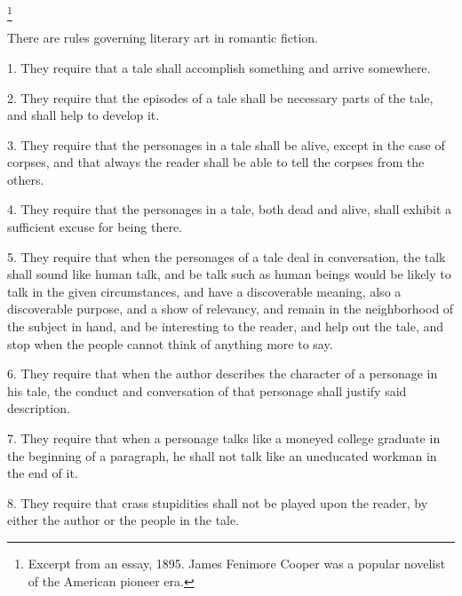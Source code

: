 \documentclass[../interior-demo.tex]{subfiles}
\begin{document}
\begin{upperpage}
\footnote{Excerpt from an essay, 1895. James Fenimore Cooper was a popular
novelist of the American pioneer era.}
\end{upperpage}
There are rules governing literary art in romantic fiction.

1. They require that a tale shall accomplish something and arrive
somewhere.

2. They require that the episodes of a tale shall be necessary parts of
the tale, and shall help to develop it.

3. They require that the personages in a tale shall be alive, except in
the case of corpses, and that always the reader shall be able to tell
the corpses from the others.

4. They require that the personages in a tale, both dead and alive,
shall exhibit a sufficient excuse for being there.

5. They require that when the personages of a tale deal in conversation,
the talk shall sound like human talk, and be talk such as human
beings would be likely to talk in the given circumstances, and have
a discoverable meaning, also a discoverable purpose, and a show of
relevancy, and remain in the neighborhood of the subject in hand, and
be interesting to the reader, and help out the tale, and stop when the
people cannot think of anything more to say.

6. They require that when the author describes the character of a
personage in his tale, the conduct and conversation of that personage
shall justify said description.

7. They require that when a personage talks like a moneyed college
graduate in the beginning of a paragraph, he shall not talk like an uneducated
workman in the end of it.

8. They require that crass stupidities shall not be played upon the
reader, by either the author or the people in the tale.
\end{document}
